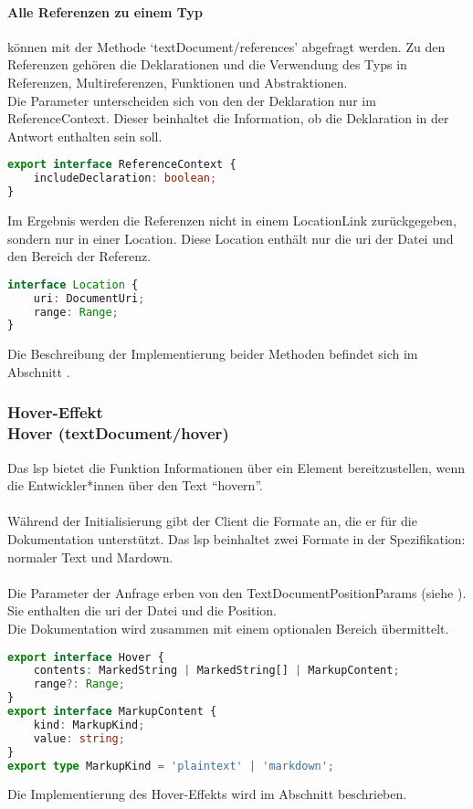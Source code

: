 \documentclass[./einleitung.tex]{subfiles}
\begin{document}
    \paragraph{Alle Referenzen zu einem Typ} können mit der Methode `textDocument/references' abgefragt werden.
    Zu den Referenzen gehören die Deklarationen und die Verwendung des Typs in Referenzen, Multireferenzen, Funktionen und Abstraktionen.\\
    Die Parameter unterscheiden sich von den der Deklaration nur im ReferenceContext.
    Dieser beinhaltet die Information, ob die Deklaration in der Antwort enthalten sein soll.
    \begin{lstlisting}[language=Typescript, title=Definition des ReferenceContext \cite{references}, label=lst:referenceContext]
export interface ReferenceContext {
	includeDeclaration: boolean;
}
    \end{lstlisting}
    Im Ergebnis werden die Referenzen nicht in einem LocationLink zurückgegeben, sondern nur in einer Location.
    Diese Location enthält nur die \acrshort{uri} der Datei und den Bereich der Referenz.
    \begin{lstlisting}[language=Typescript, title=Definition der Location \cite{references}, label=lst:location]
interface Location {
	uri: DocumentUri;
	range: Range;
}
    \end{lstlisting}

    Die Beschreibung der Implementierung beider Methoden befindet sich im Abschnitt .

    \subsubsection[Hover-Effekt]{Hover-Effekt\\ {\textnormal{\footnotesize Hover (textDocument/hover) \cite{hover}}}}\label{subsubsec:hover}
    Das \acrshort{lsp} bietet die Funktion Informationen über ein Element bereitzustellen, wenn die Entwickler*innen über den Text ``hovern''.
    \\\\
    Während der Initialisierung gibt der Client die Formate an, die er für die Dokumentation unterstützt.
    Das \acrshort{lsp} beinhaltet zwei Formate in der Spezifikation: normaler Text und Mardown.
    \\\\
    Die Parameter der Anfrage erben von den TextDocumentPositionParams (siehe ).
    Sie enthalten die \acrshort{uri} der Datei und die Position.\\
    Die Dokumentation wird zusammen mit einem optionalen Bereich übermittelt.
    \begin{lstlisting}[language=Typescript, caption=Definition des Hover Ergebnis \cite{hover}, label=lst:hover]
export interface Hover {
	contents: MarkedString | MarkedString[] | MarkupContent;
	range?: Range;
}
export interface MarkupContent {
	kind: MarkupKind;
	value: string;
}
export type MarkupKind = 'plaintext' | 'markdown';
    \end{lstlisting}
    Die Implementierung des Hover-Effekts wird im Abschnitt  beschrieben.
\end{document}
